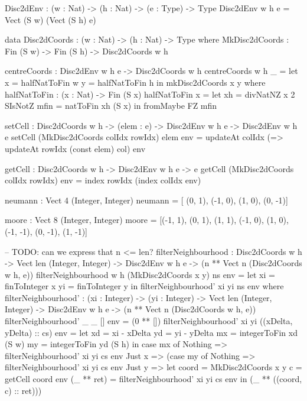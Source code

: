 \begin{HaskellCode}
Disc2dEnv : (w : Nat) -> (h : Nat) -> (e : Type) -> Type
Disc2dEnv w h e = Vect (S w) (Vect (S h) e)

data Disc2dCoords : (w : Nat) -> (h : Nat) -> Type where
  MkDisc2dCoords : Fin (S w) -> Fin (S h) -> Disc2dCoords w h
  
centreCoords : Disc2dEnv w h e -> Disc2dCoords w h
centreCoords {w} {h} _ =
    let x = halfNatToFin w
        y = halfNatToFin h
    in  mkDisc2dCoords x y
  where
    halfNatToFin : (x : Nat) -> Fin (S x)
    halfNatToFin x = 
      let xh   = divNatNZ x 2 SIsNotZ 
          mfin = natToFin xh (S x)
      in  fromMaybe FZ mfin
      
setCell :  Disc2dCoords w h
        -> (elem : e)
        -> Disc2dEnv w h e
        -> Disc2dEnv w h e
setCell (MkDisc2dCoords colIdx rowIdx) elem env 
    = updateAt colIdx (\col => updateAt rowIdx (const elem) col) env
 
getCell :  Disc2dCoords w h
        -> Disc2dEnv w h e
        -> e
getCell (MkDisc2dCoords colIdx rowIdx) env
    = index rowIdx (index colIdx env)
    
neumann : Vect 4 (Integer, Integer)
neumann = [         (0,  1), 
           (-1,  0),         (1,  0),
                    (0, -1)]

moore : Vect 8 (Integer, Integer)
moore = [(-1,  1), (0,  1), (1,  1),
         (-1,  0),          (1,  0),
         (-1, -1), (0, -1), (1, -1)]

-- TODO: can we express that n <= len?
filterNeighbourhood :  Disc2dCoords w h
                    -> Vect len (Integer, Integer)
                    -> Disc2dEnv w h e 
                    -> (n ** Vect n (Disc2dCoords w h, e))
filterNeighbourhood {w} {h} (MkDisc2dCoords x y) ns env =
    let xi = finToInteger x
        yi = finToInteger y
    in  filterNeighbourhood' xi yi ns env
  where
    filterNeighbourhood' :  (xi : Integer)
                         -> (yi : Integer)
                         -> Vect len (Integer, Integer)
                         -> Disc2dEnv w h e 
                         -> (n ** Vect n (Disc2dCoords w h, e))
    filterNeighbourhood' _ _ [] env = (0 ** [])
    filterNeighbourhood' xi yi ((xDelta, yDelta) :: cs) env 
      = let xd = xi - xDelta
            yd = yi - yDelta
            mx = integerToFin xd (S w)
            my = integerToFin yd (S h)
        in case mx of
            Nothing => filterNeighbourhood' xi yi cs env 
            Just x  => (case my of 
                        Nothing => filterNeighbourhood' xi yi cs env 
                        Just y  => let coord      = MkDisc2dCoords x y
                                       c          = getCell coord env
                                       (_ ** ret) = filterNeighbourhood' xi yi cs env
                                   in  (_ ** ((coord, c) :: ret)))
\end{HaskellCode}


